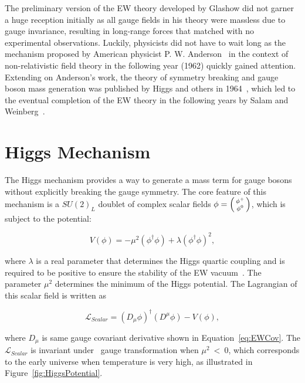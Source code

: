 The preliminary version of the \ac{EW} theory developed by Glashow did not garner a huge reception initially as all gauge fields in his theory were massless due to gauge invariance, resulting in long-range forces that matched with no experimental observations. Luckily, physicists did not have to wait long as the mechanism proposed by American physicist P. W. Anderson~\cite{Anderson:1963pc} in the context of non-relativistic field theory in the following year (1962) quickly gained attention. Extending on Anderson's work, the theory of symmetry breaking and gauge boson mass generation was published by Higgs and others in 1964~\cite{PhysRevLett.13.321,PhysRevLett.13.508,PhysRevLett.13.585}, which led to the eventual completion of the \ac{EW} theory in the following years by Salam and Weinberg~\cite{Salam:1964ry,Weinberg:1967tq}.

\section{Higgs Mechanism}
\label{sec:Higgs}

The Higgs mechanism provides a way to generate a mass term for gauge bosons without explicitly breaking the gauge symmetry. The core feature of this mechanism is a $SU(2)_{L}$ doublet of complex scalar fields $\phi=\begin{psmallmatrix}\phi^{+}\\\phi^{0}\end{psmallmatrix}$, which is subject to the potential:

\begin{equation}
V(\phi)=-\mu^2(\phi^{\dagger}\phi)+\lambda(\phi^{\dagger}\phi)^2,
\end{equation}

where $\lambda$ is a real parameter that determines the Higgs quartic coupling and is required to be positive to ensure the stability of the \ac{EW} vacuum~\cite{Cabibbo:1979ay}. The parameter $\mu^2$ determines the minimum of the Higgs potential. The Lagrangian of this scalar field is written as 

\begin{equation}
\mathcal{L}_{Scalar}=(D_{\mu}\phi)^{\dagger}(D^{\mu}\phi)-V(\phi),
\end{equation}

where $D_{\mu}$ is same gauge covariant derivative shown in Equation~\ref{eq:EWCov}. The $\mathcal{L}_{Scalar}$ is invariant under \ew~gauge transformation when $\mu^2~<~0$, which corresponds to the early universe when temperature is very high, as illustrated in Figure~\ref{fig:HiggsPotential}.

